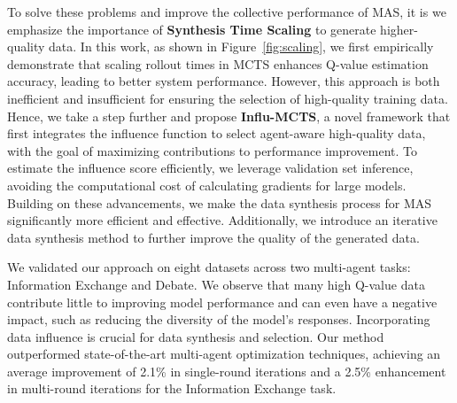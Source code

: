 To solve these problems and improve the collective performance of MAS, it is we emphasize the importance of \textbf{Synthesis Time Scaling} to generate higher-quality data. In this work, as shown in Figure~\ref{fig:scaling}, we first empirically demonstrate that scaling rollout times in MCTS enhances Q-value estimation accuracy, leading to better system performance. However, this approach is both inefficient and insufficient for ensuring the selection of high-quality training data. Hence, we take a step further and propose \textbf{Influ-MCTS}, a novel framework that first integrates the influence function to select agent-aware high-quality data, with the goal of maximizing contributions to performance improvement. To estimate the influence score efficiently, we leverage validation set inference, avoiding the computational cost of calculating gradients for large models. Building on these advancements, we make the data synthesis process for MAS significantly more efficient and effective. Additionally, we introduce an iterative data synthesis method to further improve the quality of the generated data.

We validated our approach on eight datasets across two multi-agent tasks: Information Exchange and Debate. We observe that many high Q-value data contribute little to improving model performance and can even have a negative impact, such as reducing the diversity of the model's responses. Incorporating data influence is crucial for data synthesis and selection. Our method outperformed state-of-the-art multi-agent optimization techniques, achieving an average improvement of 2.1\% in single-round iterations and a 2.5\% enhancement in multi-round iterations for the Information Exchange task. 

